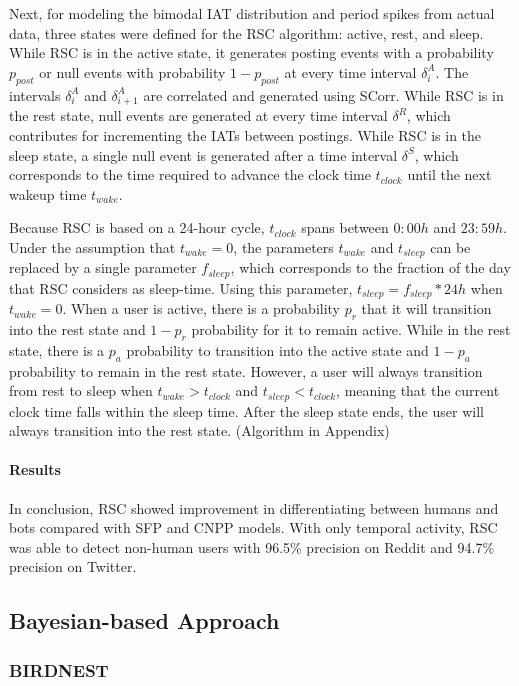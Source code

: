 \documentclass[11pt, oneside]{article}   	%
\begin{document}
\quad Next, for modeling the bimodal IAT distribution and period spikes from actual data, three states were defined for the RSC algorithm: active, rest, and sleep.
While RSC is in the active state, it generates posting events with a probability $p_{post}$ or null events with probability $1-p_{post}$ at every time interval $\delta_i^A$.
The intervals $\delta_i^A$ and $\delta_{i+1}^A$ are correlated and generated using SCorr.
While RSC is in the rest state, null events are generated at every time interval $\delta^R$, which contributes for incrementing the IATs between postings.
While RSC is in the sleep state, a single null event is generated after a time interval $\delta^S$, which corresponds to the time required to advance the clock time $t_{clock}$ until the next wakeup time $t_{wake}$.

\quad Because RSC is based on a 24-hour cycle, $t_{clock}$ spans between $0:00h$ and $23:59h$.
Under the assumption that $t_{wake}=0$, the parameters $t_{wake}$ and $t_{sleep}$ can be replaced by a single parameter $f_{sleep}$, which corresponds to the fraction of the day that RSC considers as sleep-time.
Using this parameter, $t_{sleep}=f_{sleep}*24h$ when $t_{wake}=0$.
When a user is active, there is a probability $p_r$ that it will transition into the rest state and $1-p_r$ probability for it to remain active.
While in the rest state, there is a $p_a$ probability to transition into the active state and $1-p_a$ probability to remain in the rest state.
However, a user will always transition from rest to sleep when $t_{wake} > t_{clock}$ and $t_{sleep} < t_{clock}$, meaning that the current clock time falls within the sleep time.
After the sleep state ends, the user will always transition into the rest state. (Algorithm in Appendix)

\paragraph*{Results}
\quad

\quad In conclusion, RSC showed improvement in differentiating between humans and bots compared with SFP and CNPP models.
With only temporal activity, RSC was able to detect non-human users with 96.5\% precision on Reddit and 94.7\% precision on Twitter.
\subsection{Bayesian-based Approach}
\subsubsection*{BIRDNEST }
\end{document}
